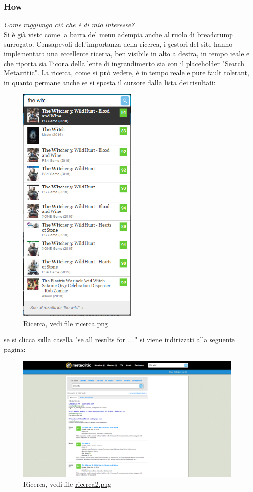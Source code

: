 \documentclass[12pt]{article}
\begin{document}
\subsubsection{How}
\textit{Come raggiungo ciò che è di mio interesse?}\\
Si è già visto come la barra del menu adempia anche al ruolo di breadcrump surrogato. Consapevoli dell'importanza della ricerca, i gestori del sito hanno implementato una eccellente ricerca, ben visibile in alto a destra, in tempo reale e che riporta sia l'icona della lente di ingrandimento sia con il placeholder "Search Metacritic". La ricerca, come si può vedere, è in tempo reale e pure fault tolerant, in quanto permane anche se si sposta il cursore dalla lista dei risultati:
\begin{figure}[H]
	\begin{center}
		\includegraphics[height=12cm]{ricerca.png}
		\caption{Ricerca, vedi file \href{ricerca.png}{ricerca.png}}
	\end{center}
\end{figure}
se si clicca sulla casella "se all results for ...." si viene indirizzati alla seguente pagina:
\begin{figure}[H]
	\begin{center}
		\includegraphics[width=13.5cm]{ricerca2.png}
		\caption{Ricerca, vedi file \href{ricerca2.png}{ricerca2.png}}
	\end{center}
\end{figure}
\end{document}
